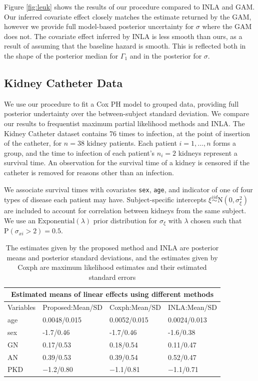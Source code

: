 \documentclass[]{article}
\begin{document}
Figure \ref{fig:leuk} shows the results of our procedure compared to INLA and GAM. Our inferred covariate effect closely matches the estimate returned by the GAM, however we provide full model-based posterior uncertainty for $\sigma$ where the GAM does not. The covariate effect inferred by INLA is less smooth than ours, as a result of assuming that the baseline hazard is smooth. This is reflected both in the shape of the posterior median for $\Gamma_{1}$ and in the posterior for $\sigma$.

\subsection{Kidney Catheter Data}

We use our procedure to fit a Cox PH model to grouped data, providing full posterior undertainty over the between-subject standard deviation. We compare our results to frequentist maximum partial likelihood methods and INLA. The Kidney Catheter dataset contains 76 times to infection, at the point of insertion of the catheter, for $n = 38$  kidney patients. Each patient $i=1,\ldots,n$ forms a group, and the time to infection of each patient's $n_{i} = 2$ kidneys represent a survival time. An observation for the survival time of a kidney is censored if the catheter is removed for reasons other than an infection. 

We associate survival times with covariates \texttt{sex}, \texttt{age}, and indicator of one of four types of disease each patient may have. Subject-specific intercepts $\xi\overset{iid}{\sim}\text{N}(0,\sigma^{2}_{\xi})$ are included to account for correlation between kidneys from the same subject. We use an $\text{Exponential}(\lambda)$ prior distribution for $\sigma_{\xi}$ with $\lambda$ chosen such that $\text{P}(\sigma_{xi} > 2) = 0.5$.

\begin{table}[ht]
\centering
\begin{tabular}{ |p{3cm}||p{3cm}|p{3cm}|p{3cm}|}
 \hline
 \multicolumn{4}{|c|}{Estimated means of linear effects using different methods} \\
 \hline
 Variables & Proposed:Mean/SD & Coxph:Mean/SD &INLA:Mean/SD \\
 \hline
 age & 0.0048/0.015 & 0.0052/0.015 & 0.0024/0.013\\
 sex & -1.7/0.46  & -1.7/0.46 &  -1.6/0.38\\
 GN & 0.17/0.53 &  0.18/0.54 & 0.11/0.47\\
 AN & 0.39/0.53 & 0.39/0.54 & 0.52/0.47\\
 PKD & −1.2/0.80  & −1.1/0.81 & −1.1/0.71\\
\hline
\end{tabular}
\caption{The estimates given by the proposed method and INLA are posterior means and posterior standard deviations, and the estimates given by Coxph are maximum likelihood estimates and their estimated standard errors}
\label{table:KidneyFixed}
\end{table}
\end{document}

